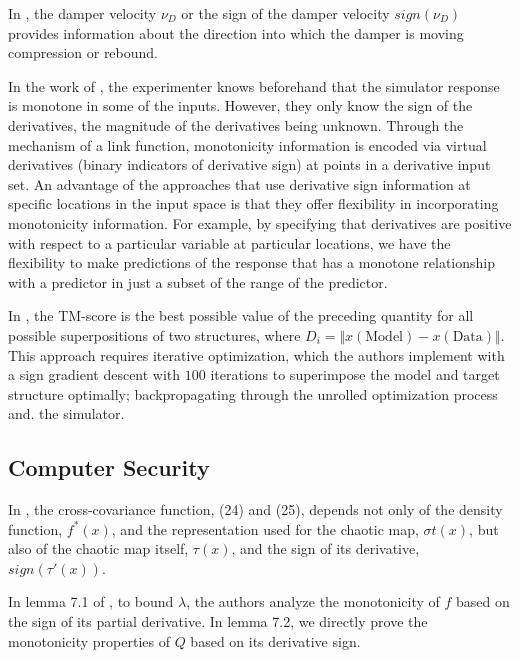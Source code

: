 \documentclass[11pt]{book}
\begin{document}
In \cite{zhang2009comparison}, the damper velocity $\nu_{D}$ or
the sign of the damper velocity $sign(\nu_{D})$ provides information
about the direction into which the damper is moving compression or
rebound.

In the work of \cite{golchi2015monotone}, the experimenter knows
beforehand that the simulator response is monotone in some of the
inputs. However, they only know the sign of the derivatives, the magnitude
of the derivatives being unknown. Through the mechanism of a link
function, monotonicity information is encoded via virtual derivatives
(binary indicators of derivative sign) at points in a derivative input
set. An advantage of the approaches that use derivative sign information
at specific locations in the input space is that they offer flexibility
in incorporating monotonicity information. For example, by specifying
that derivatives are positive with respect to a particular variable
at particular locations, we have the flexibility to make predictions
of the response that has a monotone relationship with a predictor
in just a subset of the range of the predictor.

In \cite{ingraham2018learning}, the TM-score is the best possible
value of the preceding quantity for all possible superpositions of
two structures, where $D_{i}=\Vert x\left(\text{Model}\right)-x\left(\text{Data}\right)\Vert$.
This approach requires iterative optimization, which the authors implement
with a sign gradient descent with $100$ iterations to superimpose
the model and target structure optimally; backpropagating through
the unrolled optimization process and. the simulator.


\subsection{Computer Security}

In \cite{cristea2008statistical}, the cross-covariance function,
(24) and (25), depends not only of the density function, $f^{\ast}(x)$,
and the representation used for the chaotic map, $\sigma t(x)$, but
also of the chaotic map itself, $\tau\left(x\right)$, and the sign
of its derivative, $sign\left(\tau'\left(x\right)\right)$.

In lemma 7.1 of \cite{ghazi2018resource}, to bound $\lambda$, the
authors analyze the monotonicity of $f$ based on the sign of its
partial derivative. In lemma 7.2, we directly prove the monotonicity
properties of $Q$ based on its derivative sign.
\end{document}
